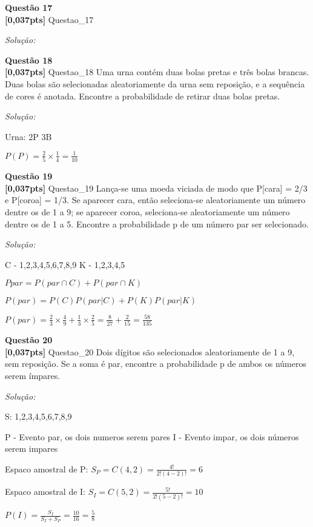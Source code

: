 \documentclass{article}
\newenvironment{problem}[2][Questão]
    { \begin{mdframed}[backgroundcolor=gray!20] \textbf{#1 #2} \\}
    {  \end{mdframed}}
\newenvironment{solution}
    {\textit{Solução:}}
    {}
\begin{document}
\begin{problem}{17}
\textbf{[0,037pts]} Questao\_17 
\end{problem}

\begin{solution}

\end{solution}

\begin{problem}{18}
\textbf{[0,037pts]} Questao\_18 Uma  urna  contém  duas  bolas  pretas  e  três  bolas  brancas.  Duas  bolas  são  selecionadas aleatoriamente da urna sem reposição, e a sequência de cores é anotada. Encontre a 
probabilidade de retirar duas bolas pretas.
\end{problem}

\begin{solution}

Urna: 2P 3B

$P(P) = \frac{2}{5} \times \frac{1}{4} = \frac{1}{10}$


\end{solution}

\begin{problem}{19}
\textbf{[0,037pts]} Questao\_19 Lança-se  uma moeda viciada de  modo que  P[cara] =  2/3 e  P[coroa] =  1/3. Se aparecer 
cara,  então  seleciona-se  aleatoriamente  um  número  dentre  os  de  1  a  9;  se  aparecer  coroa, 
seleciona-se aleatoriamente um número dentre os de 1 a 5. Encontre a probabilidade p de um 
número par ser selecionado.
\end{problem}

\begin{solution}

C - {1,2,3,4,5,6,7,8,9}
K - {1,2,3,4,5}

$P{par} = P(par \cap C) + P(par \cap K)$

$P(par) = P(C)P(par|C) + P(K)P(par|K)$

$P(par) = \frac{2}{3} \times \frac{4}{9} + \frac{1}{3} \times \frac{2}{5} = \frac{8}{27} + \frac{2}{15} = \frac{58}{135}$

\end{solution}

\begin{problem}{20}
\textbf{[0,037pts]} Questao\_20 Dois  dígitos  são  selecionados  aleatoriamente  de  1  a  9,  sem  reposição.  Se  a  soma  é  par, encontre a probabilidade p de ambos os números serem ímpares.
\end{problem}

\begin{solution}

S: {1,2,3,4,5,6,7,8,9}

P - Evento par, os dois numeros serem pares
I - Evento impar, os dois números serem impares

Espaco amostral de P: $S_{P} = C(4,2) = \frac{4!}{2!(4 - 2)!} = 6$

Espaco amostral de I: $S_{I} = C(5,2) = \frac{5!}{2!(5 - 2)!} = 10$

$P(I) = \frac{S_{I}}{S_{I} + S_{P}} = \frac{10}{16} = \frac{5}{8}$

\end{solution}
\end{document}
